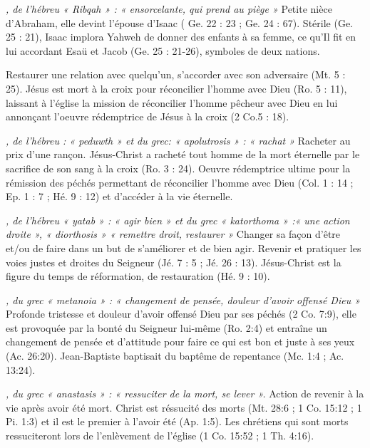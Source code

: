 \begin{multicols}{2}
\textit{, de l'hébreu « Ribqah » : « ensorcelante, qui prend au piège »}\newline
Petite nièce d'Abraham, elle devint l'épouse d'Isaac ( Ge. 22 : 23 ; Ge. 24 : 67). Stérile (Ge. 25 : 21), Isaac implora Yahweh de donner des enfants à sa femme, ce qu'Il fit en lui accordant Esaü et Jacob (Ge. 25 : 21-26), symboles de deux nations.

\textit{}\newline
Restaurer une relation avec quelqu'un, s'accorder avec son adversaire (Mt. 5 : 25). Jésus est mort à la croix pour réconcilier l'homme avec Dieu (Ro. 5 : 11), laissant à l'église la mission de réconcilier l'homme pêcheur avec Dieu en lui annonçant l'oeuvre rédemptrice de Jésus à la croix (2 Co.5 : 18).

\textit{, de l'hébreu : « peduwth » et du grec: « apolutrosis » : « rachat »}\newline
Racheter au prix d'une rançon. Jésus-Christ a racheté tout homme de la mort éternelle par le sacrifice de son sang à la croix (Ro. 3 : 24). Oeuvre rédemptrice ultime pour la rémission des péchés permettant de réconcilier l'homme avec Dieu (Col. 1 : 14 ; Ep. 1 : 7 ; Hé. 9 : 12) et d'accéder à la vie éternelle.

\textit{, de l'hébreu « yatab » : « agir bien » et du grec « katorthoma » :« une action droite », « diorthosis » « remettre droit, restaurer »}\newline
Changer sa façon d'être et/ou de faire dans un but de s'améliorer et de bien agir. Revenir et pratiquer les voies justes et droites du Seigneur (Jé. 7 : 5 ; Jé. 26 : 13). Jésus-Christ est la figure du temps de réformation, de restauration (Hé. 9 : 10).

\textit{, du grec « metanoia » : « changement de pensée, douleur d'avoir offensé Dieu »}\newline
Profonde tristesse et douleur d'avoir offensé Dieu par ses péchés (2 Co. 7:9), elle est provoquée par la bonté du Seigneur lui-même (Ro. 2:4) et entraîne un changement de pensée et d'attitude pour faire ce qui est bon et juste à ses yeux (Ac. 26:20). Jean-Baptiste baptisait du baptême de repentance (Mc. 1:4 ; Ac. 13:24).

\textit{, du grec « anastasis » : « ressuciter de la mort, se lever ».}\newline
Action de revenir à la vie après avoir été mort. Christ est réssucité des morts (Mt. 28:6 ; 1 Co. 15:12 ; 1 Pi. 1:3) et il est le premier à l'avoir été (Ap. 1:5). Les chrétiens qui sont morts ressuciteront lors de l'enlèvement de l'église (1 Co. 15:52 ; 1 Th. 4:16).


\end{multicols}
